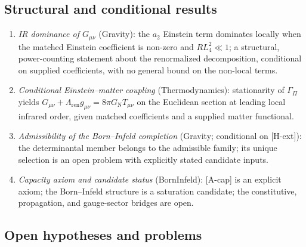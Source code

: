 \documentclass[11pt,a4paper]{article}
\theoremstyle{definition}
\newcommand{\GN}{G_{\mathrm{N}}}
\begin{document}
    \subsection{Structural and conditional results}
      \label{sec:structural}

      \begin{enumerate}
        \item \textit{IR dominance of $G_{\mu\nu}$} (Gravity):
        the $a_2$ Einstein term dominates locally when the matched Einstein coefficient is non-zero and
        $RL_4^2 \ll 1$; a structural, power-counting statement about
        the renormalized decomposition, conditional on supplied coefficients, with no general bound on the
        non-local terms.

        \item \textit{Conditional Einstein--matter coupling} (Thermodynamics):
        stationarity of $\Gamma_\Pi$ yields
        $G_{\mu\nu} + \Lambda_{\mathrm{ren}} g_{\mu\nu} = 8\pi\GN T_{\mu\nu}$ on the
        Euclidean section at leading local infrared order, given matched coefficients and a supplied matter
        functional.

        \item \textit{Admissibility of the Born--Infeld completion} (Gravity; conditional
        on [H-ext]): the determinantal member belongs to the admissible family; its unique
        selection is an open problem with explicitly stated candidate inputs.

        \item \textit{Capacity axiom and candidate status} (BornInfeld):
        [A-cap] is an explicit axiom; the Born--Infeld structure is a saturation candidate;
        the constitutive, propagation, and gauge-sector bridges are open.
      \end{enumerate}

    \subsection{Open hypotheses and problems}
      \label{sec:open-hyp}
\end{document}
